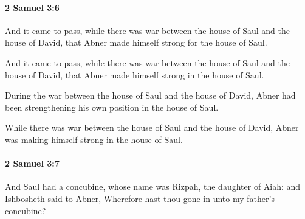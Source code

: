 		\paragraph{2 Samuel 3:6} %
			\label{2SAMUEL-3-6}

			And it came to pass, while there was war between the house of Saul and the house of David, that Abner made himself strong for the house of Saul.

			\begin{versebox}
					\item[BHS] 
					\item[ASV] And it came to pass, while there was war between the house of Saul and the house of David, that Abner made himself strong in the house of Saul.
					\item[NIV] During the war between the house of Saul and the house of David, Abner had been strengthening his own position in the house of Saul.
					\item[NRSV] While there was war between the house of Saul and the house of David, Abner was making himself strong in the house of Saul.
			\end{versebox}

		\paragraph{2 Samuel 3:7} %
			\label{2SAMUEL-3-7}

			And Saul had a concubine, whose name was Rizpah, the daughter of Aiah: and Ishbosheth said to Abner, Wherefore hast thou gone in unto my father’s concubine?

